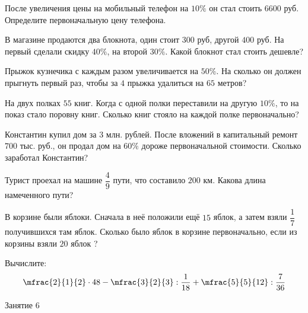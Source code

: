 \begin{class}[number=5]
	\begin{listofex}
		\item После увеличения цены на мобильный телефон на \( 10\% \) он стал стоить \( 6600 \) руб. Определите первоначальную цену телефона.
		\item  В магазине продаются два блокнота, один стоит \( 300 \) руб, другой \( 400 \) руб. На первый сделали скидку \( 40\% \), на второй \( 30\% \). Какой блокнот стал стоить дешевле?
		\item Прыжок кузнечика с каждым разом увеличивается на \( 50\% \). На сколько он должен прыгнуть первый раз, чтобы за \( 4 \) прыжка удалиться на \( 65 \) метров?
		\item На двух полках \( 55 \) книг. Когда с одной полки переставили на другую \( 10\% \), то на показ стало поровну книг. Сколько книг стояло на каждой полке первоначально?
		\item Константин купил дом за \( 3 \) млн. рублей. После вложений в капитальный ремонт \( 700 \) тыс. руб., он продал дом на \( 60\% \) дороже первоначальной стоимости. Сколько заработал Константин?
		\item Турист проехал на машине \( \dfrac{4}{9} \) пути, что составило \( 200 \) км. Какова длина намеченного пути?
		\item В корзине были яблоки. Сначала в неё положили ещё \( 15 \) яблок, а затем взяли \( \dfrac{1}{7} \) получившихся там яблок. Сколько было яблок в корзине первоначально, если из корзины взяли \( 20 \) яблок ?
		\item Вычислите:
		\[\mfrac{2}{1}{2}\cdot48-\mfrac{3}{2}{3}:\dfrac{1}{18}+\mfrac{5}{5}{12}:\dfrac{7}{36}\]
	\end{listofex}
\end{class}

\begin{class}[number=6]
	\begin{listofex}
		\item Занятие 6
	\end{listofex}
\end{class}

